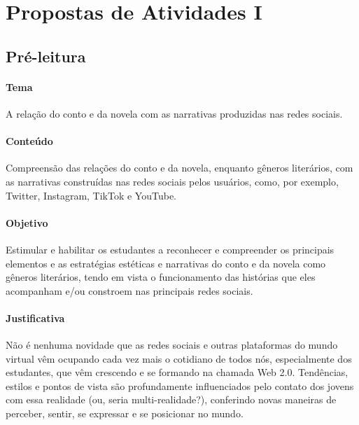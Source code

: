 \documentclass[12pt]{extarticle}
\begin{document}
\tableofcontents


\section{Propostas de Atividades I}



\subsection{Pré-leitura}


\paragraph{Tema} A relação do conto e da novela com as narrativas produzidas nas redes sociais. 

\paragraph{Conteúdo} Compreensão das relações do conto e da novela,
enquanto gêneros literários, com as narrativas construídas nas redes
sociais pelos usuários, como, por exemplo, Twitter, Instagram, TikTok e
YouTube.

\paragraph{Objetivo} Estimular e habilitar os estudantes a reconhecer e
compreender os principais elementos e as estratégias estéticas e
narrativas do conto e da novela como gêneros literários, tendo em vista
o funcionamento das histórias que eles acompanham e/ou constroem nas
principais redes sociais.

\paragraph{Justificativa} Não é nenhuma novidade que as redes sociais e
outras plataformas do mundo virtual vêm ocupando cada vez mais o
cotidiano de todos nós, especialmente dos estudantes, que vêm crescendo
e se formando na chamada Web 2.0. Tendências, estilos e pontos de vista
são profundamente influenciados pelo contato dos jovens com essa
realidade (ou, seria multi-realidade?), conferindo novas maneiras de
perceber, sentir, se expressar e se posicionar no mundo.
\end{document}
